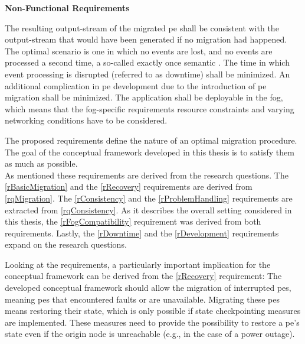 \textbf{Non-Functional Requirements}
\begin{enumerate}[wide=0em, labelindent=0.25cm, leftmargin=4.25cm, labelwidth=4cm, labelsep=0em]
    \label{rConsistency} The resulting output-stream of the migrated \gls{pe} shall be consistent with the output-stream that would have been generated if no migration had happened. The optimal scenario is one in which no events are lost, and no events are processed a second time, a so-called exactly once semantic \cite{Huang.2001}.
    \label{rDowntime} The time in which event processing is disrupted (referred to as downtime) shall be minimized.
    \label{rDevelopment} An additional complication in \gls{pe} development due to the introduction of \gls{pe} migration shall be minimized.
    \label{rFogCompatibility} The application shall be deployable in the fog, which means that the fog-specific requirements resource constraints \cite{Yousefpour.2019} and varying networking conditions \cite{Puliafito.2018} have to be considered.
\end{enumerate}

The proposed requirements define the nature of an optimal migration procedure. The goal of the conceptual framework developed in this thesis is to satisfy them as much as possible.\\
As mentioned these requirements are derived from the research questions. The \ref{rBasicMigration} and the \ref{rRecovery} requirements are derived from \ref{rqMigration}. The \ref{rConsistency} and the \ref{rProblemHandling} requirements are extracted from \ref{rqConsistency}. As it describes the overall setting considered in this thesis, the \ref{rFogCompatibility} requirement was derived from both requirements. Lastly, the \ref{rDowntime} and the \ref{rDevelopment} requirements expand on the research questions.\par
Looking at the requirements, a particularly important implication for the conceptual framework can be derived from the \ref{rRecovery} requirement: The developed conceptual framework should allow the migration of interrupted \gls{pe}s, meaning \gls{pe}s that encountered faults or are unavailable. Migrating these \gls{pe}s means restoring their state, which is only possible if state checkpointing measures are implemented. These measures need to provide the possibility to restore a \gls{pe}'s state even if the origin node is unreachable (e.g., in the case of a power outage).


